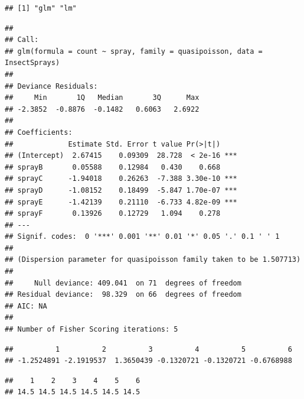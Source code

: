 \documentclass[krantz2]{krantz}\usepackage{knitr}
\begin{document}
\begin{knitrout}\footnotesize
{}\color{fgcolor}\begin{kframe}
\begin{alltt}
\end{alltt}
\begin{verbatim}
## [1] "glm" "lm"
\end{verbatim}
\begin{alltt}
\end{alltt}
\begin{verbatim}
## 
## Call:
## glm(formula = count ~ spray, family = quasipoisson, data = InsectSprays)
## 
## Deviance Residuals: 
##     Min       1Q   Median       3Q      Max  
## -2.3852  -0.8876  -0.1482   0.6063   2.6922  
## 
## Coefficients:
##             Estimate Std. Error t value Pr(>|t|)    
## (Intercept)  2.67415    0.09309  28.728  < 2e-16 ***
## sprayB       0.05588    0.12984   0.430    0.668    
## sprayC      -1.94018    0.26263  -7.388 3.30e-10 ***
## sprayD      -1.08152    0.18499  -5.847 1.70e-07 ***
## sprayE      -1.42139    0.21110  -6.733 4.82e-09 ***
## sprayF       0.13926    0.12729   1.094    0.278    
## ---
## Signif. codes:  0 '***' 0.001 '**' 0.01 '*' 0.05 '.' 0.1 ' ' 1
## 
## (Dispersion parameter for quasipoisson family taken to be 1.507713)
## 
##     Null deviance: 409.041  on 71  degrees of freedom
## Residual deviance:  98.329  on 66  degrees of freedom
## AIC: NA
## 
## Number of Fisher Scoring iterations: 5
\end{verbatim}
\begin{alltt}
\hlstd{(}
\end{alltt}
\begin{verbatim}
##          1          2          3          4          5          6 
## -1.2524891 -2.1919537  1.3650439 -0.1320721 -0.1320721 -0.6768988
\end{verbatim}
\begin{alltt}
\hlstd{(}
\end{alltt}
\begin{verbatim}
##    1    2    3    4    5    6 
## 14.5 14.5 14.5 14.5 14.5 14.5
\end{verbatim}
\end{kframe}
\end{knitrout}
\end{document}
